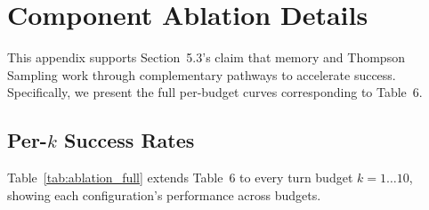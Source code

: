 \documentclass[a4paper,fleqn]{cas-sc}
\begin{document}
\section{Component Ablation Details}
\label{app:ablation}

This appendix supports Section~5.3's claim that memory and Thompson Sampling work through complementary pathways to accelerate success.
Specifically, we present the full per-budget curves corresponding to Table~6.

\subsection{Per-\texorpdfstring{$k$}{k} Success Rates}
Table~\ref{tab:ablation_full} extends Table~6 to every turn budget $k=1 \dots 10$, showing each configuration's performance across budgets.
\end{document}
